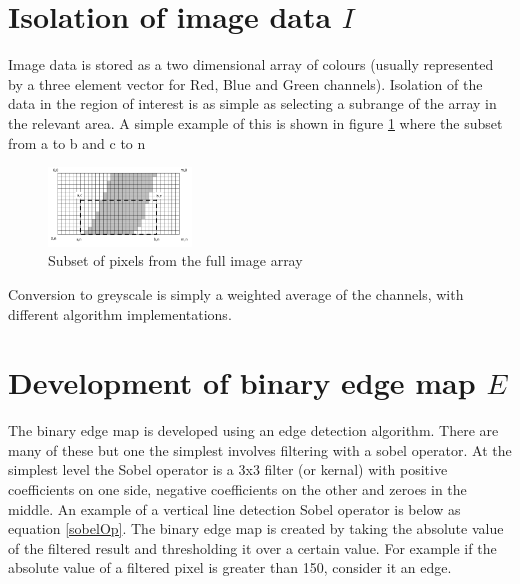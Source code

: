 \documentclass{article}
\begin{document}
	\section{Isolation of image data \textit{$I$}}
	
	Image data is stored as a two dimensional array of colours (usually represented by a three element vector for Red, Blue and Green channels). Isolation of the data in the region of interest is as simple as selecting a subrange of the array in the relevant area. A simple example of this is shown in figure \ref{pixelSubset} where the subset from a to b and c to n
	
	\begin{figure}
		\begin{center}
			\includegraphics[width=0.34\textwidth]{pixelSubset}
		\end{center}
		\caption{Subset of pixels from the full image array}
		\label{pixelSubset}
	\end{figure}

%	
	
	Conversion to greyscale is simply a weighted average of the channels, with different algorithm implementations.
	
	\section{Development of binary edge map \textit{$E$}}
	
	 The binary edge map is developed using an edge detection algorithm. There are many of these but one the simplest involves filtering with a sobel operator. At the simplest level the Sobel operator is a 3x3 filter (or kernal) with positive coefficients on one side, negative coefficients on the other and zeroes in the middle. An example of a vertical line detection Sobel operator is below as equation \ref{sobelOp}. The binary edge map is created by taking the absolute value of the filtered result and thresholding it over a certain value. For example if the absolute value of a filtered pixel is greater than 150, consider it an edge. \\
\end{document}
